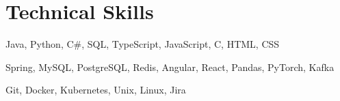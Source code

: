 \documentclass[letterpaper,11pt]{article}
\begin{document}
\section{Technical Skills}
 \begin{description}[leftmargin=!,labelwidth=\widthof{\small\textit{Programming Languages:XX}}, itemsep=0.5pt, parsep=0.5pt]
  \item[\small{Languages:}] \small Java, Python,  C\#, SQL, TypeScript, JavaScript, C, HTML, CSS
  \item[\small{Frameworks \& Libraries:}] \small Spring, MySQL, PostgreSQL, Redis, Angular, React, Pandas, PyTorch, Kafka
  \item[\small{Developer Tools:}] \small Git, Docker, Kubernetes, Unix, Linux, Jira
\end{description}
\vspace{-10pt}

\end{document}
